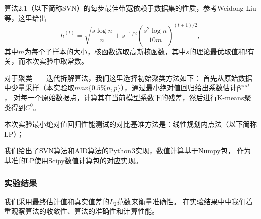 算法2.1（以下简称SVN）的每步最佳带宽依赖于数据集的性质，参考Weidong Liu等\cite{svn}，这里给出
$$
    h^{(t)} = \sqrt{\frac{s\log n}{n}} + s^{-1/2} (\frac{s^2\log n}{10m})^{(t+1)/2},
$$
其中$m$为每个子样本的大小，核函数选取高斯核函数，其中$s$的理论最优取值和$l$有关，而本次实验中取常数。

对于聚类——迭代拆解算法，我们这里选择初始聚类方法如下：
首先从原始数据中少量采样（本实验取$max\{0.5\%n, p\}$），通过最小绝对值回归给出系数估计$\bm{\beta}^{init}$，
对每一个原始数据点，计算其在当前模型系数下的残差，然后进行K-means聚类得到$C^0$。

本次实验最小绝对值回归性能测试的对比基准方法是：线性规划内点法（以下简称LP）；

我们给出了SVN算法和AID算法的Python3实现，数值计算基于Numpy包，
作为基准的LP使用Scipy数值计算包的对应实现。

\subsubsection{实验结果}
我们采用最终估计值和真实值差的$L_2$范数来衡量准确性。
在实验结果中中我们着重观察算法的收敛性、算法的准确性和计算性能。

